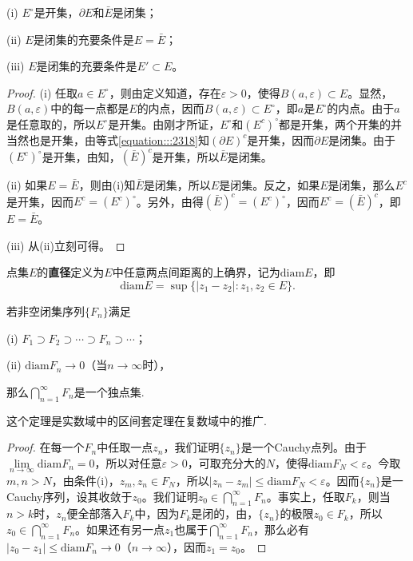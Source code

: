 \documentclass[../../main.tex]{subfiles}
\begin{document}
\begin{proposition}\label{proposition:开集,闭集的充要条件}
(i) \(E^\circ\)是开集，\(\partial E\)和\(\bar{E}\)是闭集；

(ii) \(E\)是闭集的充要条件是\(E = \bar{E}\)；

(iii) \(E\)是闭集的充要条件是\(E' \subset E\)。
\end{proposition}
\begin{proof}
(i) 任取\(a \in E^\circ\)，则由定义知道，存在\(\varepsilon > 0\)，使得\(B(a, \varepsilon) \subset E\)。显然，\(B(a, \varepsilon)\)中的每一点都是\(E\)的内点，因而\(B(a, \varepsilon) \subset E^\circ\)，即\(a\)是\(E^\circ\)的内点。由于\(a\)是任意取的，所以\(E^\circ\)是开集。由刚才所证，\(E^\circ\)和\((E^c)^\circ\)都是开集，两个开集的并当然也是开集，由等式\eqref{equation:::2318}知\((\partial E)^c\)是开集，因而\(\partial E\)是闭集。由于\((E^c)^\circ\)是开集，由知，\((\bar{E})^c\)是开集，所以\(\bar{E}\)是闭集。

(ii) 如果\(E = \bar{E}\)，则由(i)知\(\bar{E}\)是闭集，所以\(E\)是闭集。反之，如果\(E\)是闭集，那么\(E^c\)是开集，因而\(E^c = (E^c)^\circ\)。另外，由得\((\bar{E})^c = (E^c)^\circ\)，因而\(E^c = (\bar{E})^c\)，即\(E = \bar{E}\)。

(iii) 从(ii)立刻可得。 
\end{proof}

\begin{definition}
点集\(E\)的\textbf{直径}定义为\(E\)中任意两点间距离的上确界，记为\(\mathrm{diam}E\)，即
\[
\mathrm{diam}E = \sup\{ | z_1 - z_2 | : z_1, z_2 \in E \}.
\]
\end{definition}

\begin{theorem}[Cantor闭集套定理]\label{theorem:Cantor闭集套定理}
若非空闭集序列\(\{ F_n \}\)满足

(i) \(F_1 \supset F_2 \supset \cdots \supset F_n \supset \cdots\)；

(ii) \(\mathrm{diam}F_n \to 0\)（当\(n \to \infty\)时），

那么\(\bigcap_{n = 1}^\infty F_n\)是一个独点集.
\end{theorem}
\begin{note}
这个定理是实数域中的区间套定理在复数域中的推广.
\end{note}
\begin{proof}
在每一个\(F_n\)中任取一点\(z_n\)，我们证明\(\{ z_n \}\)是一个Cauchy点列。由于\(\lim\limits_{n \to \infty}\mathrm{diam}F_n = 0\)，所以对任意\(\varepsilon > 0\)，可取充分大的\(N\)，使得\(\mathrm{diam}F_N < \varepsilon\)。今取\(m, n > N\)，由条件(i)，\(z_m, z_n \in F_N\)，所以\(| z_n - z_m | \leqslant \mathrm{diam}F_N < \varepsilon\)。因而\(\{ z_n \}\)是一Cauchy序列，设其收敛于\(z_0\)。我们证明\(z_0 \in \bigcap_{n = 1}^\infty F_n\)。事实上，任取\(F_k\)，则当\(n > k\)时，\(z_n\)便全部落入\(F_k\)中，因为\(F_k\)是闭的，由，\(\{ z_n \}\)的极限\(z_0 \in F_k\)，所以\(z_0 \in \bigcap_{n = 1}^\infty F_n\)。如果还有另一点\(z_1\)也属于\(\bigcap_{n = 1}^\infty F_n\)，那么必有\(| z_0 - z_1 | \leqslant \mathrm{diam}F_n \to 0\)（\(n \to \infty\)），因而\(z_1 = z_0\)。 
\end{proof}
\end{document}
